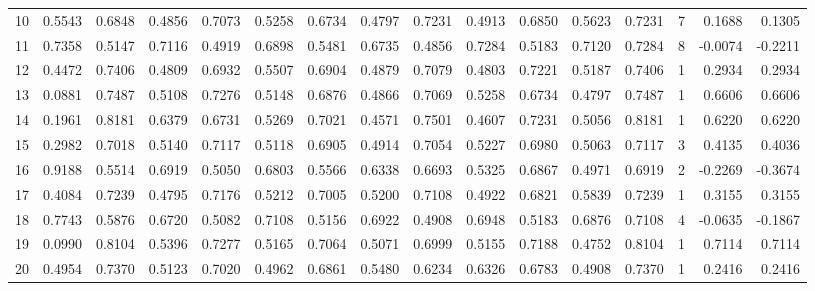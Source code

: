 \begin{tabular}{lrrrrrrrrrrrrrrr}
10  &      0.5543 &  0.6848 &  0.4856 &  0.7073 &  0.5258 &  0.6734 &  0.4797 &  0.7231 &  0.4913 &  0.6850 &   0.5623 &     0.7231 &      7 &                    0.1688 &                     0.1305 \\
11  &      0.7358 &  0.5147 &  0.7116 &  0.4919 &  0.6898 &  0.5481 &  0.6735 &  0.4856 &  0.7284 &  0.5183 &   0.7120 &     0.7284 &      8 &                   -0.0074 &                    -0.2211 \\
12  &      0.4472 &  0.7406 &  0.4809 &  0.6932 &  0.5507 &  0.6904 &  0.4879 &  0.7079 &  0.4803 &  0.7221 &   0.5187 &     0.7406 &      1 &                    0.2934 &                     0.2934 \\
13  &      0.0881 &  0.7487 &  0.5108 &  0.7276 &  0.5148 &  0.6876 &  0.4866 &  0.7069 &  0.5258 &  0.6734 &   0.4797 &     0.7487 &      1 &                    0.6606 &                     0.6606 \\
14  &      0.1961 &  0.8181 &  0.6379 &  0.6731 &  0.5269 &  0.7021 &  0.4571 &  0.7501 &  0.4607 &  0.7231 &   0.5056 &     0.8181 &      1 &                    0.6220 &                     0.6220 \\
15  &      0.2982 &  0.7018 &  0.5140 &  0.7117 &  0.5118 &  0.6905 &  0.4914 &  0.7054 &  0.5227 &  0.6980 &   0.5063 &     0.7117 &      3 &                    0.4135 &                     0.4036 \\
16  &      0.9188 &  0.5514 &  0.6919 &  0.5050 &  0.6803 &  0.5566 &  0.6338 &  0.6693 &  0.5325 &  0.6867 &   0.4971 &     0.6919 &      2 &                   -0.2269 &                    -0.3674 \\
17  &      0.4084 &  0.7239 &  0.4795 &  0.7176 &  0.5212 &  0.7005 &  0.5200 &  0.7108 &  0.4922 &  0.6821 &   0.5839 &     0.7239 &      1 &                    0.3155 &                     0.3155 \\
18  &      0.7743 &  0.5876 &  0.6720 &  0.5082 &  0.7108 &  0.5156 &  0.6922 &  0.4908 &  0.6948 &  0.5183 &   0.6876 &     0.7108 &      4 &                   -0.0635 &                    -0.1867 \\
19  &      0.0990 &  0.8104 &  0.5396 &  0.7277 &  0.5165 &  0.7064 &  0.5071 &  0.6999 &  0.5155 &  0.7188 &   0.4752 &     0.8104 &      1 &                    0.7114 &                     0.7114 \\
20  &      0.4954 &  0.7370 &  0.5123 &  0.7020 &  0.4962 &  0.6861 &  0.5480 &  0.6234 &  0.6326 &  0.6783 &   0.4908 &     0.7370 &      1 &                    0.2416 &                     0.2416 \\

\end{tabular}

